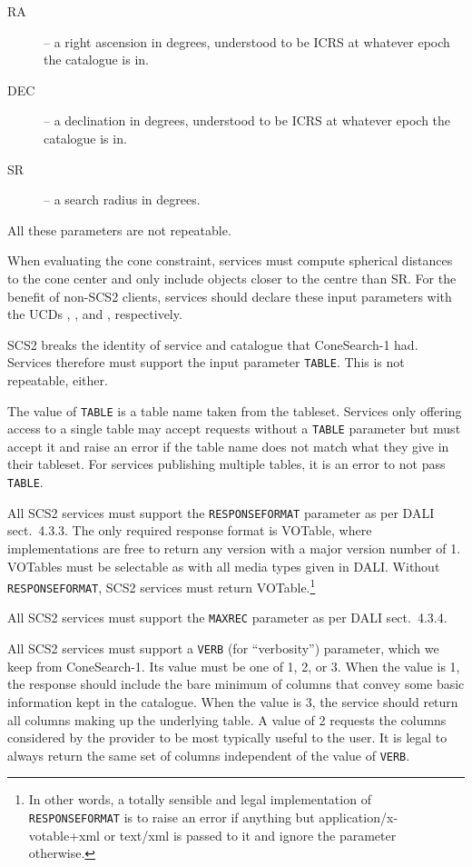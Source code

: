 \documentclass[11pt,a4paper]{ivoa}
\begin{document}
\begin{description}
\item[RA] -- a right ascension in degrees, understood to be ICRS at
whatever epoch the catalogue is in.
\item[DEC] -- a declination in degrees, understood to be ICRS at
whatever epoch the catalogue is in.
\item[SR] -- a search radius in degrees.
\end{description}

All these parameters are not repeatable.

When evaluating the cone constraint, services must compute spherical
distances to the cone center and only include objects closer to the
centre than SR.  For the benefit of
non-SCS2 clients, services should declare these
input parameters with the UCDs , , and
, respectively.

SCS2 breaks the identity of service and catalogue that ConeSearch-1 had.
Services therefore must support the input parameter \verb|TABLE|.  This
is not repeatable, either.

The value of \verb|TABLE| is a table name taken from the tableset.  Services
only offering access to a single table may accept requests without a
\verb|TABLE| parameter but must accept it and raise an error if the table name
does not match what they give in their tableset.  For services
publishing multiple tables, it is an error to not pass \verb|TABLE|.

All SCS2 services must support the \verb|RESPONSEFORMAT| parameter as
per DALI sect.~4.3.3.  The only required response format is VOTable,
where implementations are free to return any version with a major
version number of 1.  VOTables must be selectable as with all media
types given in DALI.  Without \verb|RESPONSEFORMAT|, SCS2 services must return
VOTable.\footnote{In other words, a totally sensible and legal
implementation of \texttt{RESPONSEFORMAT} is to raise an error if anything but
application/x-votable+xml or text/xml is passed to it and ignore the
parameter otherwise.}

All SCS2 services must support the \verb|MAXREC| parameter as per DALI
sect.~4.3.4.

All SCS2 services must support a \verb|VERB| (for ``verbosity'')
parameter, which we keep from ConeSearch-1.  Its value must be one of 1, 2, or
3.  When the value is 1, the response should include the bare minimum of
columns that convey some basic information kept in the catalogue.  When
the value is 3, the service should return all columns making up the
underlying table.  A value of 2 requests the columns considered by the
provider to be most typically useful to the user.   It is legal to
always return the same set of columns independent of the value of
\verb|VERB|.
\end{document}
